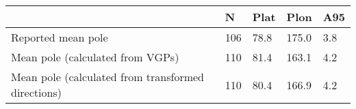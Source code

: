 \begin{tabular}{lllll}
\toprule
{} &    N &  Plat &   Plon &  A95 \\
\midrule
Reported mean pole                                 &  106 &  78.8 &  175.0 &  3.8 \\
Mean pole (calculated from VGPs)                   &  110 &  81.4 &  163.1 &  4.2 \\
Mean pole (calculated from transformed directions) &  110 &  80.4 &  166.9 &  4.2 \\
\bottomrule
\end{tabular}
